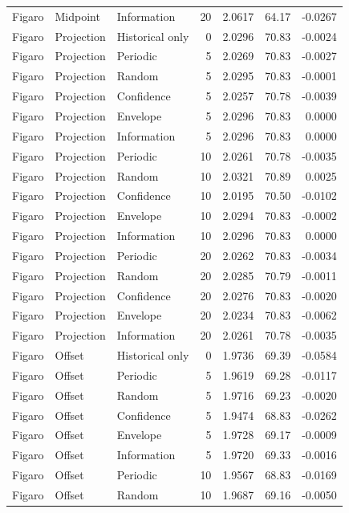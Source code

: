 \begin{longtable}{lllrrrr}
Figaro & Midpoint & Information & 20 & 2.0617 & 64.17 & -0.0267 \\
Figaro & Projection & Historical only & 0 & 2.0296 & 70.83 & -0.0024 \\
Figaro & Projection & Periodic & 5 & 2.0269 & 70.83 & -0.0027 \\
Figaro & Projection & Random & 5 & 2.0295 & 70.83 & -0.0001 \\
Figaro & Projection & Confidence & 5 & 2.0257 & 70.78 & -0.0039 \\
Figaro & Projection & Envelope & 5 & 2.0296 & 70.83 & 0.0000 \\
Figaro & Projection & Information & 5 & 2.0296 & 70.83 & 0.0000 \\
Figaro & Projection & Periodic & 10 & 2.0261 & 70.78 & -0.0035 \\
Figaro & Projection & Random & 10 & 2.0321 & 70.89 & 0.0025 \\
Figaro & Projection & Confidence & 10 & 2.0195 & 70.50 & -0.0102 \\
Figaro & Projection & Envelope & 10 & 2.0294 & 70.83 & -0.0002 \\
Figaro & Projection & Information & 10 & 2.0296 & 70.83 & 0.0000 \\
Figaro & Projection & Periodic & 20 & 2.0262 & 70.83 & -0.0034 \\
Figaro & Projection & Random & 20 & 2.0285 & 70.79 & -0.0011 \\
Figaro & Projection & Confidence & 20 & 2.0276 & 70.83 & -0.0020 \\
Figaro & Projection & Envelope & 20 & 2.0234 & 70.83 & -0.0062 \\
Figaro & Projection & Information & 20 & 2.0261 & 70.78 & -0.0035 \\
Figaro & Offset & Historical only & 0 & 1.9736 & 69.39 & -0.0584 \\
Figaro & Offset & Periodic & 5 & 1.9619 & 69.28 & -0.0117 \\
Figaro & Offset & Random & 5 & 1.9716 & 69.23 & -0.0020 \\
Figaro & Offset & Confidence & 5 & 1.9474 & 68.83 & -0.0262 \\
Figaro & Offset & Envelope & 5 & 1.9728 & 69.17 & -0.0009 \\
Figaro & Offset & Information & 5 & 1.9720 & 69.33 & -0.0016 \\
Figaro & Offset & Periodic & 10 & 1.9567 & 68.83 & -0.0169 \\
Figaro & Offset & Random & 10 & 1.9687 & 69.16 & -0.0050 \\

\end{longtable}
